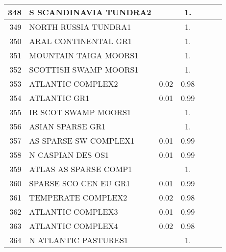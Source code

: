 {{\begin{tabular}{||r|l||c|c|c|c|c||}
 \hline
         348  & S SCANDINAVIA TUNDRA2                                        &       &  1.   &       &       \\
 \hline
         349  & NORTH RUSSIA TUNDRA1                                         &       &  1.   &       &       \\
 \hline
         350  & ARAL CONTINENTAL GR1                                         &       &  1.   &       &       \\
 \hline
         351  & MOUNTAIN TAIGA MOORS1                                        &       &  1.   &       &       \\
 \hline
         352  & SCOTTISH SWAMP MOORS1                                        &       &  1.   &       &       \\
 \hline
         353  & ATLANTIC COMPLEX2                                            &  0.02 &  0.98 &       &       \\
 \hline
         354  & ATLANTIC GR1                                                 &  0.01 &  0.99 &       &       \\
 \hline
         355  & IR SCOT SWAMP MOORS1                                         &       &  1.   &       &       \\
 \hline
         356  & ASIAN SPARSE GR1                                             &       &  1.   &       &       \\
 \hline
         357  & AS SPARSE SW COMPLEX1                                        &  0.01 &  0.99 &       &       \\
 \hline
         358  & N CASPIAN DES OS1                                            &  0.01 &  0.99 &       &       \\
 \hline
         359  & ATLAS AS SPARSE COMP1                                        &       &  1.   &       &       \\
 \hline
         360  & SPARSE SCO CEN EU GR1                                        &  0.01 &  0.99 &       &       \\
 \hline
         361  & TEMPERATE COMPLEX2                                           &  0.02 &  0.98 &       &       \\
 \hline
         362  & ATLANTIC COMPLEX3                                            &  0.01 &  0.99 &       &       \\
 \hline
         363  & ATLANTIC COMPLEX4                                            &  0.02 &  0.98 &       &       \\
 \hline
         364  & N ATLANTIC PASTURES1                                         &       &  1.   &       &       \\

\end{tabular}}}
